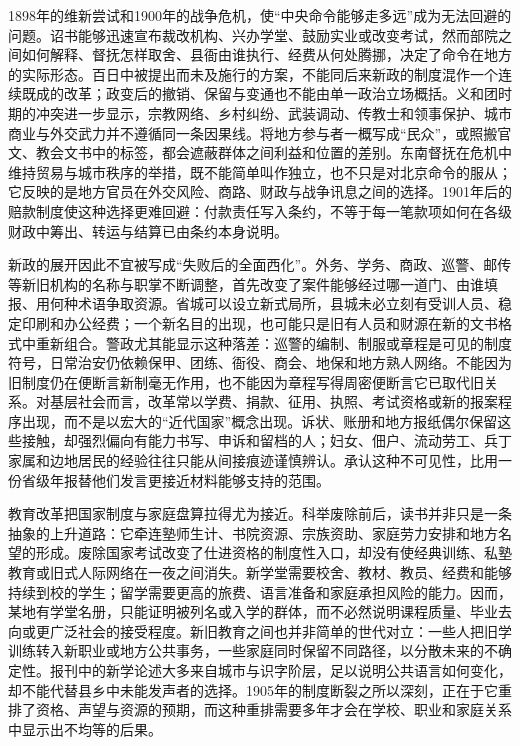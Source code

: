 1898年的维新尝试和1900年的战争危机，使“中央命令能够走多远”成为无法回避的问题。诏书能够迅速宣布裁改机构、兴办学堂、鼓励实业或改变考试，然而部院之间如何解释、督抚怎样取舍、县衙由谁执行、经费从何处腾挪，决定了命令在地方的实际形态。百日中被提出而未及施行的方案，不能同后来新政的制度混作一个连续既成的改革；政变后的撤销、保留与变通也不能由单一政治立场概括。义和团时期的冲突进一步显示，宗教网络、乡村纠纷、武装调动、传教士和领事保护、城市商业与外交武力并不遵循同一条因果线。将地方参与者一概写成“民众”，或照搬官文、教会文书中的标签，都会遮蔽群体之间利益和位置的差别。东南督抚在危机中维持贸易与城市秩序的举措，既不能简单叫作独立，也不只是对北京命令的服从；它反映的是地方官员在外交风险、商路、财政与战争讯息之间的选择。1901年后的赔款制度使这种选择更难回避：付款责任写入条约，不等于每一笔款项如何在各级财政中筹出、转运与结算已由条约本身说明。

新政的展开因此不宜被写成“失败后的全面西化”。外务、学务、商政、巡警、邮传等新旧机构的名称与职掌不断调整，首先改变了案件能够经过哪一道门、由谁填报、用何种术语争取资源。省城可以设立新式局所，县城未必立刻有受训人员、稳定印刷和办公经费；一个新名目的出现，也可能只是旧有人员和财源在新的文书格式中重新组合。警政尤其能显示这种落差：巡警的编制、制服或章程是可见的制度符号，日常治安仍依赖保甲、团练、衙役、商会、地保和地方熟人网络。不能因为旧制度仍在便断言新制毫无作用，也不能因为章程写得周密便断言它已取代旧关系。对基层社会而言，改革常以学费、捐款、征用、执照、考试资格或新的报案程序出现，而不是以宏大的“近代国家”概念出现。诉状、账册和地方报纸偶尔保留这些接触，却强烈偏向有能力书写、申诉和留档的人；妇女、佃户、流动劳工、兵丁家属和边地居民的经验往往只能从间接痕迹谨慎辨认。承认这种不可见性，比用一份省级年报替他们发言更接近材料能够支持的范围。

教育改革把国家制度与家庭盘算拉得尤为接近。科举废除前后，读书并非只是一条抽象的上升道路：它牵连塾师生计、书院资源、宗族资助、家庭劳力安排和地方名望的形成。废除国家考试改变了仕进资格的制度性入口，却没有使经典训练、私塾教育或旧式人际网络在一夜之间消失。新学堂需要校舍、教材、教员、经费和能够持续到校的学生；留学需要更高的旅费、语言准备和家庭承担风险的能力。因而，某地有学堂名册，只能证明被列名或入学的群体，而不必然说明课程质量、毕业去向或更广泛社会的接受程度。新旧教育之间也并非简单的世代对立：一些人把旧学训练转入新职业或地方公共事务，一些家庭同时保留不同路径，以分散未来的不确定性。报刊中的新学论述大多来自城市与识字阶层，足以说明公共语言如何变化，却不能代替县乡中未能发声者的选择。1905年的制度断裂之所以深刻，正在于它重排了资格、声望与资源的预期，而这种重排需要多年才会在学校、职业和家庭关系中显示出不均等的后果。

